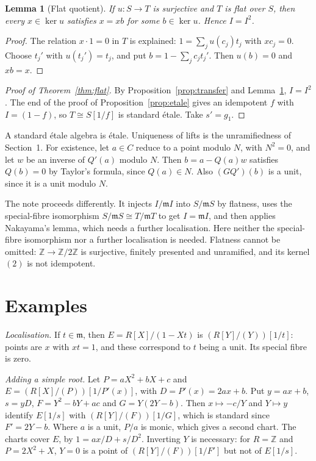 \documentclass[11pt]{amsart}
\numberwithin{equation}{section}
\newtheorem{lemma}[theorem]{Lemma}
\theoremstyle{definition}
\theoremstyle{remark}
\newcommand{\m}{\mathfrak m}
\newcommand{\ZZ}{\mathbb Z}
\begin{document}
\begin{lemma}[Flat quotient]\label{lem:flatquot}
If $u:S\to T$ is surjective and $T$ is flat over $S$, then every
$x\in\ker u$ satisfies $x=xb$ for some $b\in\ker u$. Hence $I=I^2$.
\end{lemma}
\begin{proof}
The relation $x\cdot1=0$ in $T$ is explained: $1=\sum_ju(c_j)t_j$ with
$xc_j=0$. Choose $t_j'$ with $u(t_j')=t_j$, and put
$b=1-\sum_jc_jt_j'$. Then $u(b)=0$ and $xb=x$.
\end{proof}

\begin{proof}[Proof of Theorem~\ref{thm:flat}]
By Proposition~\ref{prop:transfer} and Lemma~\ref{lem:flatquot},
$I=I^2$. The end of the proof of Proposition~\ref{prop:etale} gives an
idempotent $f$ with $I=(1-f)$, so $T\cong S[1/f]$ is standard \'etale.
Take $s'=g_1$.
\end{proof}

A standard \'etale algebra is \'etale. Uniqueness of lifts is the
unramifiedness of Section~1. For existence, let $a\in C$ reduce to a
point modulo $N$, with $N^2=0$, and let $w$ be an inverse of $Q'(a)$
modulo $N$. Then $b=a-Q(a)w$ satisfies $Q(b)=0$ by Taylor's formula,
since $Q(a)\in N$. Also $(GQ')(b)$ is a unit, since it is a unit
modulo $N$.

The note proceeds differently. It injects $I/\m I$ into $S/\m S$ by
flatness, uses the special-fibre isomorphism $S/\m S\cong T/\m T$ to
get $I=\m I$, and then applies Nakayama's lemma, which needs a further
localisation. Here neither the special-fibre isomorphism nor a further
localisation is needed. Flatness cannot be omitted: $\ZZ\to\ZZ/2\ZZ$
is surjective, finitely presented and unramified, and its kernel
$(2)$ is not idempotent.

\section{Examples}

\emph{Localisation.} If $t\in\m$, then $E=R[X]/(1-Xt)$ is
$(R[Y]/(Y))[1/t]$: points are $x$ with $xt=1$, and these correspond to
$t$ being a unit. Its special fibre is zero.

\emph{Adding a simple root.} Let $P=aX^2+bX+c$ and
$E=(R[X]/(P))[1/P'(x)]$, with $D=P'(x)=2ax+b$. Put $y=ax+b$, $s=yD$,
$F=Y^2-bY+ac$ and $G=Y(2Y-b)$. Then $x\mapsto -c/Y$ and $Y\mapsto y$
identify $E[1/s]$ with $(R[Y]/(F))[1/G]$, which is standard since
$F'=2Y-b$. Where $a$ is a unit, $P/a$ is monic, which gives a second
chart. The charts cover $E$, by $1=ax/D+s/D^2$. Inverting $Y$ is
necessary: for $R=\ZZ$ and $P=2X^2+X$, $Y=0$ is a point of
$(R[Y]/(F))[1/F']$ but not of $E[1/s]$.
\end{document}
